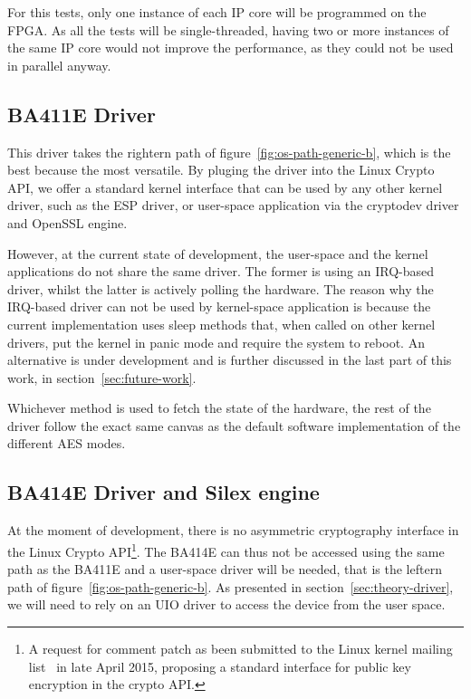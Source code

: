 For this tests, only one instance of each IP core will be programmed on the FPGA.
As all the tests will be single-threaded, having two or more instances of the same IP core would not improve the performance, as they could not be used in parallel anyway.

\subsection{BA411E Driver}
This driver takes the rightern path of figure~\ref{fig:os-path-generic-b}, which is the best because the most versatile.
By pluging the driver into the Linux Crypto API, we offer a standard kernel interface that can be used by any other kernel driver, such as the ESP driver, or user-space application via the cryptodev driver and OpenSSL engine.

However, at the current state of development, the user-space and the kernel applications do not share the same driver.
The former is using an IRQ-based driver, whilst the latter is actively polling the hardware.
The reason why the IRQ-based driver can not be used by kernel-space application is because the current implementation uses sleep methods that, when called on other kernel drivers, put the kernel in panic mode and require the system to reboot.
An alternative is under development and is further discussed in the last part of this work, in section~\ref{sec:future-work}.

Whichever method is used to fetch the state of the hardware, the rest of the driver follow the exact same canvas as the default software implementation of the different AES modes.


\subsection{BA414E Driver and Silex engine}
At the moment of development, there is no asymmetric cryptography interface in the Linux Crypto API\footnote{A request for comment patch as been submitted to the Linux kernel mailing list~\cite{crypto-api-pk-encryption} in late April 2015, proposing a standard interface for public key encryption in the crypto API.}.
The BA414E can thus not be accessed using the same path as the BA411E and a user-space driver will be needed, that is the leftern path of figure~\ref{fig:os-path-generic-b}.
As presented in section~\ref{sec:theory-driver}, we will need to rely on an UIO driver to access the device from the user space.